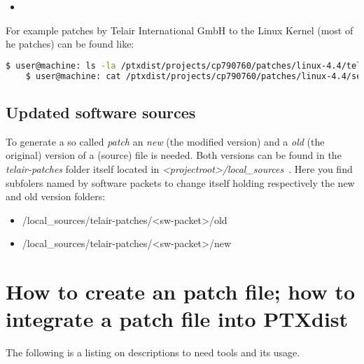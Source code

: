 \begin{itemize}
    \item
\end{itemize}

For example patches by Telair International GmbH to the Linux Kernel (most of he
patches) can be found like:

\begin{lstlisting}[keywordstyle=\color{black},language=bash,caption={Example: Location of an telair patch}]
    $ user@machine: ls -la /ptxdist/projects/cp790760/patches/linux-4.4/telair
    $ user@machine: cat /ptxdist/projects/cp790760/patches/linux-4.4/series.MBa335x
\end{lstlisting}

\subsection{Updated software sources}
To generate a so called \textit{patch} an \textit{new} (the modified version)
and a \textit{old} (the original) version of a (source) file is needed. Both
versions can be found in the \textit{telair-patches} folder itself located in
\textit{<projectroot>/local\_sources}~\footnotemark[3]. Here you find subfolers named by
software packets to change itself holding respectively the new and old
version folders:\@
\begin{itemize}
    \item <your projectroot>/local\_sources/telair-patches/<sw-packet>/old
    \item <your projectroot>/local\_sources/telair-patches/<sw-packet>/new
\end{itemize}


\section{How to create an patch file; how to integrate a patch file into PTXdist}%

The following is a listing on descriptions to need tools and its usage.

